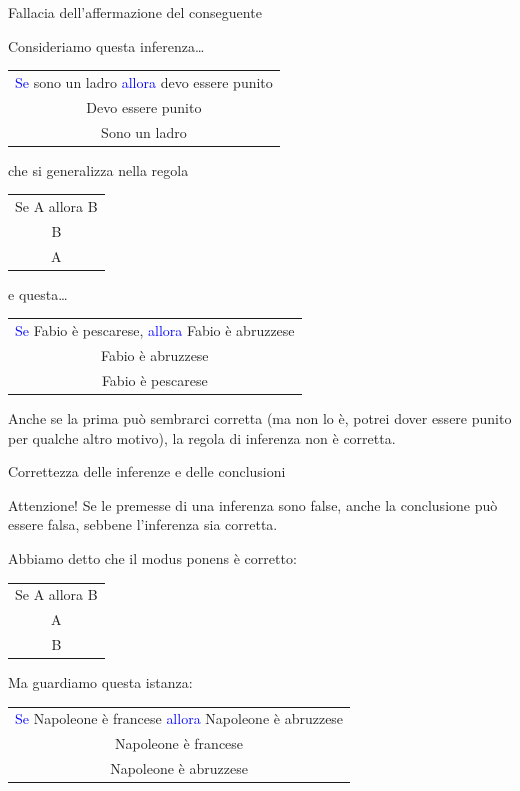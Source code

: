 \documentclass[aspectratio=169,10pt]{beamer}
\newcommand{\conn}[1]{\textcolor{blue}{#1}}
\newenvironment{inference}{\begin{tabular}{c}}{\end{tabular}}
\begin{document}
\begin{frame}{Fallacia dell'affermazione del conseguente}

	Consideriamo questa inferenza\ldots
	\begin{center}
		\begin{inference}
 		    \conn{Se} sono un ladro \conn{allora} devo essere punito\\
			Devo essere punito\\
			\hline
			Sono un ladro
	\end{inference}
	\end{center}
	\pause
    che si generalizza nella regola
    \begin{center}
        \begin{inference}
            Se A allora B\\
            B\\
            \hline
            A
        \end{inference}
    \end{center}
	e questa\ldots
	\begin{center}
		\begin{inference}
			\conn{Se} Fabio è pescarese, \conn{allora} Fabio è abruzzese\\
			Fabio è abruzzese\\
			\hline
			Fabio è pescarese
		\end{inference}
	\end{center}
	\pause
    Anche se la prima può sembrarci corretta (ma non lo è, potrei dover essere punito per qualche altro motivo), la regola di inferenza
    \alert{non è corretta}.
\end{frame}

\begin{frame}{Correttezza delle inferenze e delle conclusioni}
    \begin{block}{Attenzione!}
    Se le premesse di una inferenza sono false, anche la conclusione può essere falsa, sebbene l'inferenza sia corretta.
    \end{block}

   Abbiamo detto che il \alert{modus ponens} è corretto:
    \begin{center}
        \begin{inference}
        Se A allora B\\
        A\\
        \hline
        B
        \end{inference}
    \end{center}
    Ma guardiamo questa istanza:
    \begin{center}
        \begin{inference}
        \conn{Se} Napoleone è francese \conn{allora} Napoleone è abruzzese\\
        Napoleone è francese\\
        \hline
        Napoleone è abruzzese
        \end{inference}
    \end{center}
\end{frame}
\end{document}
